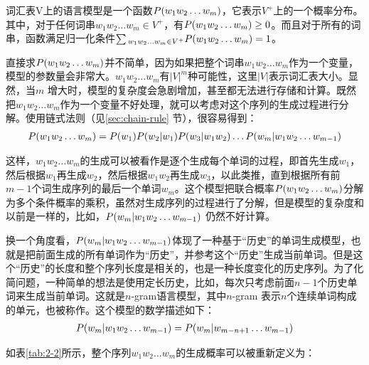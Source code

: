 \vspace{0.5em}
\begin{definition}[]
词汇表V上的语言模型是一个函数${P}(w_1 w_2 \ldots w_m)$，它表示$V^+$上的一个概率分布。其中，对于任何词串$w_1 w_2 \ldots w_m\in{V^+}$，有${P}(w_1 w_2 \ldots w_m)\geq{0}$。而且对于所有的词串，函数满足归一化条件$\sum{_{w_1 w_2 \ldots w_m\in{V^+}}{P}(w_1 w_2 \ldots w_m)}=1$。
\end{definition}

\parinterval 直接求${P}(w_1 w_2 \ldots w_m)$并不简单，因为如果把整个词串$w_1 w_2 \ldots w_m$作为一个变量，模型的参数量会非常大。$w_1 w_2 \ldots w_m$有$|V|^m$种可能性，这里$|V|$表示词汇表大小。显然，当$m$ 增大时，模型的复杂度会急剧增加，甚至都无法进行存储和计算。既然把$w_1 w_2 \ldots w_m$作为一个变量不好处理，就可以考虑对这个序列的生成过程进行分解。使用链式法则（见\ref{sec:chain-rule} 节），很容易得到：
\begin{eqnarray}
{P}(w_1 w_2 \ldots w_m)={P}(w_1){P}(w_2|w_1){P}(w_3|w_1 w_2) \ldots {P}(w_m|w_1 w_2 \ldots w_{m-1})
\label{eq:2-22}
\end{eqnarray}

\parinterval 这样，$w_1 w_2 \ldots w_m$的生成可以被看作是逐个生成每个单词的过程，即首先生成$w_1$，然后根据$w_1$再生成$w_2$，然后根据$w_1 w_2$再生成$w_3$，以此类推，直到根据所有前$m-1$个词生成序列的最后一个单词$w_m$。这个模型把联合概率${P}(w_1 w_2 \ldots w_m)$分解为多个条件概率的乘积，虽然对生成序列的过程进行了分解，但是模型的复杂度和以前是一样的，比如，${P}(w_m|w_1 w_2 \ldots w_{m-1})$ 仍然不好计算。

\parinterval 换一个角度看，${P}(w_m|w_1 w_2 \ldots w_{m-1})$体现了一种基于“历史”的单词生成模型，也就是把前面生成的所有单词作为“历史”，并参考这个“历史”生成当前单词。但是这个“历史”的长度和整个序列长度是相关的，也是一种长度变化的历史序列。为了化简问题，一种简单的想法是使用定长历史，比如，每次只考虑前面$n-1$个历史单词来生成当前单词。这就是$n$-gram语言模型，其中$n$-gram 表示$n$个连续单词构成的单元，也被称作{\small{}}。这个模型的数学描述如下：
\begin{eqnarray}
{P}(w_m|w_1 w_2 \ldots w_{m-1}) = {P}(w_m|w_{m-n+1} \ldots w_{m-1})
\label{eq:2-23}
\end{eqnarray}

\parinterval 如表\ref{tab:2-2}所示，整个序列$w_1 w_2 \ldots w_m$的生成概率可以被重新定义为：


